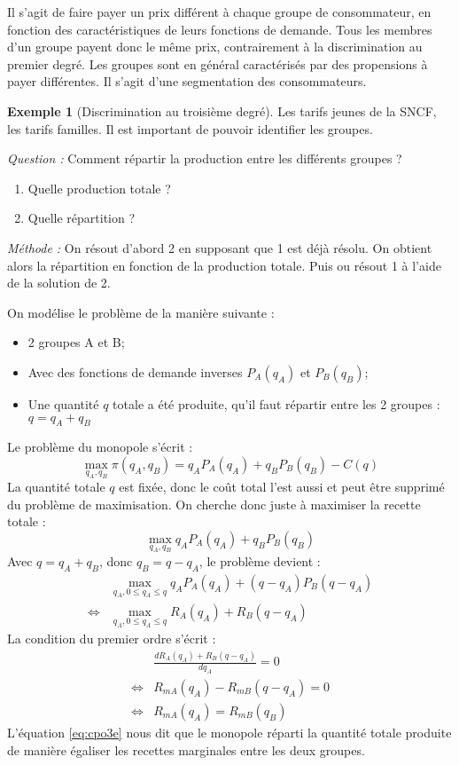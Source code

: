 \documentclass[
]{book}
\providecommand{\tightlist}{%
  \setlength{\itemsep}{0pt}\setlength{\parskip}{0pt}}
\theoremstyle{definition}
\theoremstyle{definition}
\newtheorem{example}{Exemple}[chapter]
\theoremstyle{definition}
\theoremstyle{definition}
\theoremstyle{remark}
\begin{document}
Il s'agit de faire payer un prix différent à chaque groupe de consommateur, en fonction des caractéristiques de leurs fonctions de demande.
Tous les membres d'un groupe payent donc le même prix, contrairement à la discrimination au premier degré.
Les groupes sont en général caractérisés par des propensions à payer différentes.
Il s'agit d'une segmentation des consommateurs.

\begin{example}[Discrimination au troisième degré]
Les tarifs jeunes de la SNCF, les tarifs familles.
Il est important de pouvoir identifier les groupes.
\end{example}

\emph{Question :} Comment répartir la production entre les différents groupes ?

\begin{enumerate}
\def\labelenumi{\arabic{enumi}.}
\tightlist
\item
  Quelle production totale ?
\item
  Quelle répartition ?
\end{enumerate}

\emph{Méthode :} On résout d'abord 2 en supposant que 1 est déjà résolu.
On obtient alors la répartition en fonction de la production totale.
Puis ou résout 1 à l'aide de la solution de 2.

On modélise le problème de la manière suivante :

\begin{itemize}
\tightlist
\item
  2 groupes A et B;
\item
  Avec des fonctions de demande inverses \(P_A(q_A)\) et \(P_B(q_B)\);
\item
  Une quantité \(q\) totale a été produite, qu'il faut répartir entre les 2 groupes : \(q=q_A+q_B\)
\end{itemize}

Le problème du monopole s'écrit :
\[
\max_{q_A, q_B} \pi(q_A, q_B) = q_AP_A(q_A) + q_BP_B(q_B) -C(q)
\]
La quantité totale \(q\) est fixée, donc le coût total l'est aussi et peut être supprimé du problème de maximisation.
On cherche donc juste à maximiser la recette totale :
\[
\max_{q_A, q_B} q_AP_A(q_A) + q_BP_B(q_B) 
\]
Avec \(q=q_A+q_B\), donc \(q_B=q-q_A\), le problème devient :
\[
\begin{array}{rl}
&\max_{q_A, 0\leq q_A\leq q} q_AP_A(q_A) + (q-q_A)P_B(q-q_A) \\
\Leftrightarrow &\max_{q_A, 0\leq q_A\leq q} R_A(q_A) + R_B(q-q_A) 
\end{array}
\]
La condition du premier ordre s'écrit :
\[
\begin{array}{rl}
&\frac{dR_A(q_A) + R_B(q-q_A) }{dq_A} = 0\\
\Leftrightarrow & R_{mA}(q_A) - R_{mB}(q-q_A) = 0\\
\Leftrightarrow & R_{mA}(q_A) = R_{mB}(q_B) 
\label{eq:cpo3e}
\end{array}
\]
L'équation \eqref{eq:cpo3e} nous dit que le monopole réparti la quantité totale produite de manière égaliser les recettes marginales entre les deux groupes.
\end{document}
